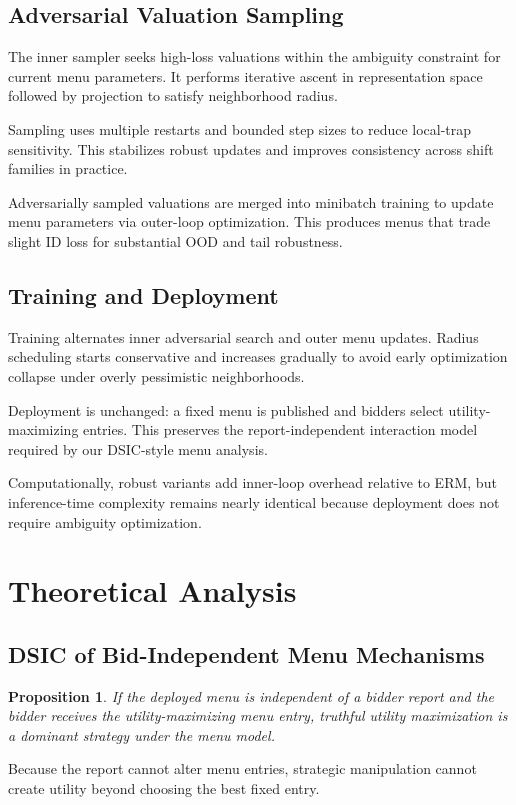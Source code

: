 \documentclass{article}
\newtheorem{proposition}{Proposition}
\begin{document}
\subsection{Adversarial Valuation Sampling}
The inner sampler seeks high-loss valuations within the ambiguity constraint for current menu parameters. It performs iterative ascent in representation space followed by projection to satisfy neighborhood radius.

Sampling uses multiple restarts and bounded step sizes to reduce local-trap sensitivity. This stabilizes robust updates and improves consistency across shift families in practice.

Adversarially sampled valuations are merged into minibatch training to update menu parameters via outer-loop optimization. This produces menus that trade slight ID loss for substantial OOD and tail robustness.

\subsection{Training and Deployment}
Training alternates inner adversarial search and outer menu updates. Radius scheduling starts conservative and increases gradually to avoid early optimization collapse under overly pessimistic neighborhoods.

Deployment is unchanged: a fixed menu is published and bidders select utility-maximizing entries. This preserves the report-independent interaction model required by our DSIC-style menu analysis.

Computationally, robust variants add inner-loop overhead relative to ERM, but inference-time complexity remains nearly identical because deployment does not require ambiguity optimization.

\section{Theoretical Analysis}
\subsection{DSIC of Bid-Independent Menu Mechanisms}
\begin{proposition}
If the deployed menu is independent of a bidder report and the bidder receives the utility-maximizing menu entry, truthful utility maximization is a dominant strategy under the menu model.
\end{proposition}
Because the report cannot alter menu entries, strategic manipulation cannot create utility beyond choosing the best fixed entry.
\end{document}
